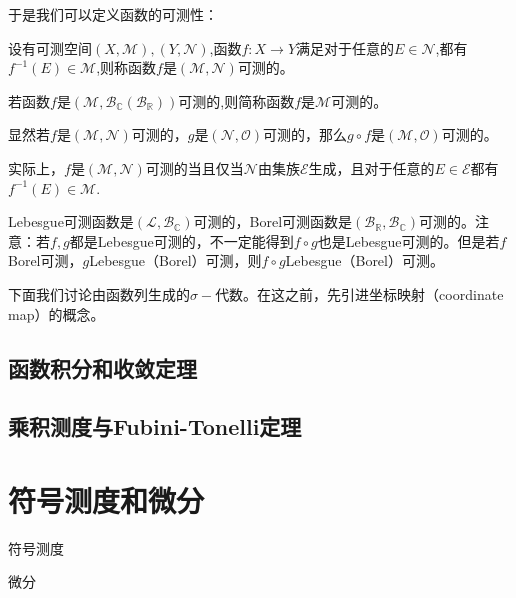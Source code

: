 \documentclass[lang=cn,10pt]{elegantbook}
\begin{document}
	于是我们可以定义函数的可测性：
	\begin{definition}[可测函数]
		设有可测空间\((X,\mathcal{M}),(Y,\mathcal{N})\),函数\(f:X\to Y\)满足对于任意的\(E\in \mathcal{N}\),都有\(f^{-1}(E)\in \mathcal{M}\),则称函数\(f\)是\((\mathcal{M},\mathcal{N})\)可测的。

		若函数\(f\)是\((\mathcal{M},\mathcal{B}_\mathbb{C}(\mathcal{B}_\mathbb{R}))\)可测的,则简称函数\(f\)是\(\mathcal{M}\)可测的。
	\end{definition}
	\begin{note}
		显然若\(f\)是\((\mathcal{M},\mathcal{N})\)可测的，\(g\)是\((\mathcal{N},\mathcal{O})\)可测的，那么\(g\circ f\)是\((\mathcal{M},\mathcal{O})\)可测的。

		实际上，\(f\)是\((\mathcal{M},\mathcal{N})\)可测的当且仅当\(\mathcal{N}\)由集族\(\mathcal{E}\)生成，且对于任意的\(E\in \mathcal{E}\)都有\(f^{-1}(E)\in \mathcal{M}\).
	\end{note}
	\begin{example}
		Lebesgue可测函数是\((\mathcal{L},\mathcal{B}_\mathbb{C})\)可测的，Borel可测函数是\((\mathcal{B}_\mathbb{R},\mathcal{B}_\mathbb{C})\)可测的。注意：若\(f,g\)都是Lebesgue可测的，不一定能得到\(f\circ g\)也是Lebesgue可测的。但是若\(f\)Borel可测，\(g\)Lebesgue（Borel）可测，则\(f\circ g\)Lebesgue（Borel）可测。
	\end{example}
	下面我们讨论由函数列生成的\(\sigma-\)代数。在这之前，先引进坐标映射（coordinate map）的概念。
	\begin{definition}[坐标映射]
		
	\end{definition}


	\section{函数积分和收敛定理}

	\section{乘积测度与Fubini-Tonelli定理}

	\chapter{符号测度和微分}
	\begin{introduction}
		\item 符号测度
		\item 微分
	\end{introduction}
	
\end{document}
